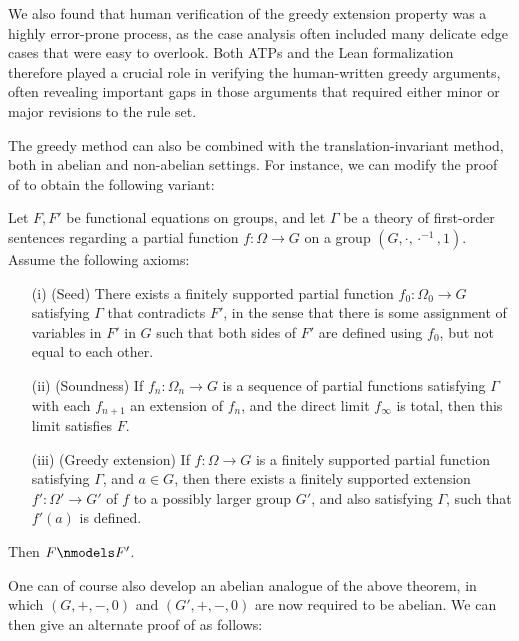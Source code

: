 We also found that human verification of the greedy extension property was a highly error-prone process, as the case analysis often included many delicate edge cases that were easy to overlook.  Both ATPs and the Lean formalization therefore played a crucial role in verifying the human-written greedy arguments, often revealing important gaps in those arguments that required either minor or major revisions to the rule set.

The greedy method can also be combined with the translation-invariant method, both in abelian and non-abelian settings. For instance, we can modify the proof of  to obtain the following variant:

\begin{theorem}\label{nc-greedy-abstract} Let $F,F'$ be functional equations on groups, and let $\Gamma$ be a theory of first-order sentences regarding a partial function $f \colon \Omega \to G$ on a group $(G,\cdot, \cdot^{-1},1)$.  Assume the following axioms:
  \begin{itemize}
    \item[(i)] (Seed) There exists a finitely supported partial function $f_0 \colon \Omega_0 \to G$ satisfying $\Gamma$ that contradicts $F'$, in the sense that there is some assignment of variables in $F'$ in $G$ such that both sides of $F'$ are defined using $f_0$, but not equal to each other.
    \item[(ii)]  (Soundness)  If $f_n \colon \Omega_n \to G$ is a sequence of partial functions satisfying $\Gamma$ with each $f_{n+1}$ an extension of $f_n$, and the direct limit $f_\infty$ is total, then this limit satisfies $F$.
    \item[(iii)] (Greedy extension)  If $f \colon \Omega \to G$ is a finitely supported partial function satisfying $\Gamma$, and $a \in G$, then there exists a finitely supported extension $f' \colon \Omega' \to G'$ of $f$ to a possibly larger group $G'$, and also satisfying $\Gamma$, such that $f'(a)$ is defined.
  \end{itemize}
  Then $F \nmodels F'$.
\end{theorem}

One can of course also develop an abelian analogue of the above theorem, in which $(G,+,-,0)$ and $(G',+,-,0)$ are now required to be abelian.  We can then give an alternate proof of  as follows:

